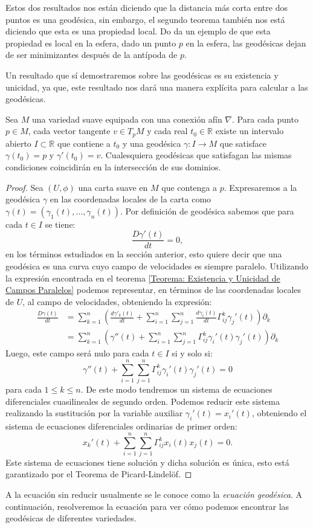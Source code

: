 Estos dos resultados nos están diciendo que la distancia más corta entre dos puntos es una geodésica, sin embargo, el segundo teorema también nos está diciendo que esta es una propiedad local. Do \textcite{do1992riemannian} da un ejemplo de que esta propiedad es local en la esfera, dado un punto $p$ en la esfera, las geodésicas dejan de ser minimizantes después de la antípoda de $p$.

Un resultado que sí demostraremos sobre las geodésicas es su existencia y unicidad, ya que, este resultado nos dará una manera explícita para calcular a las geodésicas.

\begin{theorem}
	Sea $M$ una variedad suave equipada con una conexión afín $\nabla$. Para cada punto $p \in M$, cada vector tangente $v \in T_{p}M$ y cada real $t_0 \in \mathbb{R}$ existe un intervalo abierto $I \subset \mathbb{R}$ que contiene a $t_0$ y una geodésica $\gamma: I \to M$ que satisface $\gamma(t_0) = p$ y $\gamma'(t_0) = v$. Cualesquiera geodésicas que satisfagan las mismas condiciones coincidirán en la intersección de sus dominios.
\end{theorem}

\begin{proof}
	Sea $(U,\phi)$ una carta suave en $M$ que contenga a $p$. Expresaremos a la geodésica $\gamma$ en las coordenadas locales de la carta como $\gamma(t) = (\gamma_{1}(t), \ldots, \gamma_{n}(t))$. Por definición de geodésica sabemos que para cada $t \in I$ se tiene:
	\[
		\frac{D \gamma'(t)}{dt} = 0,
	\]
	en los términos estudiados en la sección anterior, esto quiere decir que una geodésica es una curva cuyo campo de velocidades es siempre paralelo. Utilizando la expresión encontrada en el teorema \ref{Teorema: Existencia y Unicidad de Campos Paralelos} podemos representar, en términos de las coordenadas locales de $U$, al campo de velocidades, obteniendo la expresión:
	\begin{align*}
		\frac{D\gamma(t)}{dt} & = \sum_{k=1}^{n} \left(
		\frac{d\gamma'_k(t)}{dt} + \sum_{i=1}^{n}\sum_{j=1}^{n} \frac{d\gamma_{i}(t)}{dt} \Gamma_{ij}^{k}\gamma_{j}'(t)
		\right) \partial_{k}                                                                                                                    \\
		                      & = \sum_{k=1}^{n} \left( \gamma''(t) + \sum_{i=1}^{n}\sum_{j=1}^{n} \Gamma_{ij}^{k} \gamma_{i}'(t)\gamma_{j}'(t)
		\right)\partial_{k}
	\end{align*}
	Luego, este campo será nulo para cada $t \in I$ si y solo si:
	\[
		\gamma''(t) + \sum_{i=1}^{n}\sum_{j=1}^{n} \Gamma_{ij}^{k}\gamma_{i}'(t) \gamma_{j}'(t) = 0
	\]
	para cada $1 \leq k \leq n$. De este modo tendremos un sistema de ecuaciones diferenciales cuasilineales de segundo orden. Podemos reducir este sistema realizando la sustitución por la variable auxiliar $\gamma_{i}'(t) = x_{i}'(t)$, obteniendo el sistema de ecuaciones diferenciales ordinarias de primer orden:
	\[
		x_{k}'(t) + \sum_{i=1}^{n} \sum_{j=1}^{n} \Gamma_{ij}^{k} x_{i}(t) x_{j}(t) = 0.
	\]
	Este sistema de ecuaciones tiene solución y dicha solución es única, esto está garantizado por el Teorema de Picard-Lindelöf.
\end{proof}

A la ecuación sin reducir usualmente se le conoce como la \textit{ecuación geodésica}. A continuación, resolveremos la ecuación para ver cómo podemos encontrar las geodésicas de diferentes variedades.
